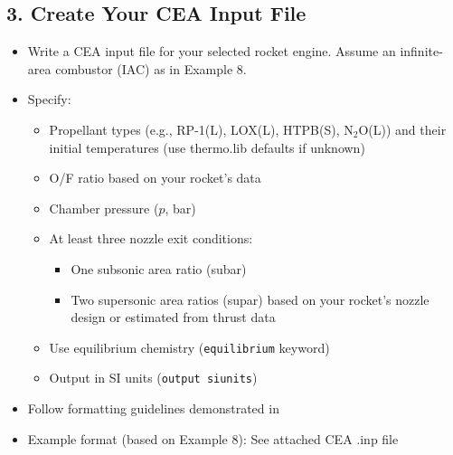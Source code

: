 \documentclass[12pt]{article}
\begin{document}
\subsection{3. Create Your CEA Input File}
\begin{itemize}
    \item Write a CEA input file for your selected rocket engine. Assume an infinite-area combustor (IAC) as in Example 8.
    \item Specify:
    \begin{itemize}
        \item Propellant types (e.g., RP-1(L), LOX(L), HTPB(S), N$_2$O(L)) and their initial temperatures (use thermo.lib defaults if unknown)
        \item O/F ratio based on your rocket's data
        \item Chamber pressure ($p$, bar)
        \item At least three nozzle exit conditions:
        \begin{itemize}
            \item One subsonic area ratio (subar)
            \item Two supersonic area ratios (supar) based on your rocket's nozzle design or estimated from thrust data
        \end{itemize}
        \item Use equilibrium chemistry (\texttt{equilibrium} keyword)
        \item Output in SI units (\texttt{output siunits})
    \end{itemize}
    \item Follow formatting guidelines demonstrated in \cite{lecture7}
    \item Example format (based on Example 8): See attached CEA .inp file
\end{itemize}
\end{document}
